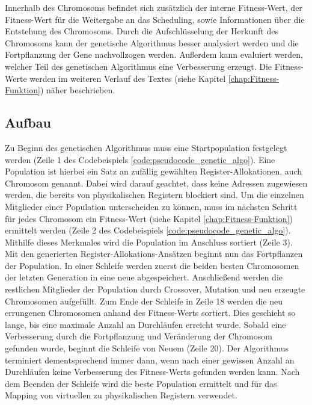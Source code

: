 Innerhalb des Chromosoms befindet sich zusätzlich der interne Fitness-Wert, der Fitness-Wert für die Weitergabe an das Scheduling, sowie Informationen über die Entstehung des Chromosoms. Durch die Aufschlüsselung der Herkunft des Chromosoms kann der genetische Algorithmus besser analysiert werden und die Fortpflanzung der Gene nachvollzogen werden. Außerdem kann evaluiert werden, welcher Teil des genetischen Algorithmus eine Verbesserung erzeugt. Die Fitness-Werte werden im weiteren Verlauf des Textes (siehe Kapitel \ref{chap:Fitness-Funktion}) näher beschrieben.
 
 
\subsection{Aufbau}
\label{chap:aufbau}
Zu Beginn des genetischen Algorithmus muss eine Startpopulation festgelegt werden (Zeile 1 des Codebeispiels \ref{code:pseudocode_genetic_algo}). Eine Population ist hierbei ein Satz an zufällig gewählten Register-Allokationen, auch Chromosom genannt. Dabei wird darauf geachtet, dass keine Adressen zugewiesen werden, die bereits von physikalischen Registern blockiert sind.
Um die einzelnen Mitglieder einer Population unterscheiden zu können, muss im nächsten Schritt für jedes Chromosom ein Fitness-Wert (siehe Kapitel \ref{chap:Fitness-Funktion}) ermittelt werden (Zeile 2 des Codebeispiels \ref{code:pseudocode_genetic_algo}). Mithilfe dieses Merkmales wird die Population im Anschluss sortiert (Zeile 3). 
Mit den generierten Register-Allokations-Ansätzen beginnt nun das Fortpflanzen der Population. In einer Schleife werden zuerst die beiden besten Chromosomen der letzten Generation in eine neue abgespeichert. Anschließend werden die restlichen Mitglieder der Population durch Crossover, Mutation und neu erzeugte Chromosomen aufgefüllt. Zum Ende der Schleife in Zeile 18 werden die neu errungenen Chromosomen anhand des Fitness-Werts sortiert. Dies geschieht so lange, bis eine maximale Anzahl an Durchläufen erreicht wurde. Sobald eine Verbesserung durch die Fortpflanzung und Veränderung der Chromosom gefunden wurde, beginnt die Schleife von Neuem (Zeile 20). Der Algorithmus terminiert dementsprechend immer dann, wenn nach einer gewissen Anzahl an Durchläufen keine Verbesserung des Fitness-Werts gefunden werden kann. Nach dem Beenden der Schleife wird die beste Population ermittelt und für das Mapping von virtuellen zu physikalischen Registern verwendet.

